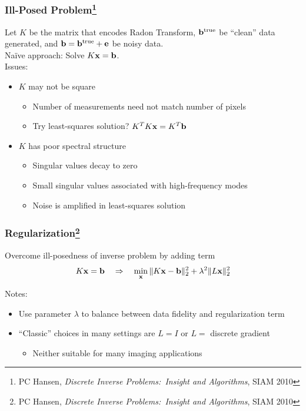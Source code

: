 \documentclass[12pt,t,xcolor=dvipsnames]{beamer}
\renewcommand{\vec}[1]{{\bf #1}}
\renewcommand{\vec}[1]{{\bf #1}}
\begin{document}
\begin{frame}
  \frametitle{Ill-Posed Problem\footnote{PC Hansen, {\it Discrete
        Inverse Problems:\ Insight and Algorithms}, SIAM 2010}}

  Let $K$ be the matrix that encodes Radon Transform, $\vec{b}^{\text{true}}$ be
  ``clean'' data generated, and $\vec{b} =
  \vec{b}^{\text{true}}+\vec{e}$ be noisy data. \\[12pt]

  \alert{Na\"ive approach:} Solve $K\vec{x} = \vec{b}$.\\[12pt]

  \pause
  Issues:
  \begin{itemize}
  \item $K$ may not be square
    \begin{itemize}
    \item Number of measurements need not match number of pixels
      \item Try least-squares solution? $K^TK\vec{x} = K^T\vec{b}$
    \end{itemize}
    \pause

  \item $K$ has poor spectral structure
    \begin{itemize}
    \item Singular values decay to zero
    \item Small singular values associated with high-frequency modes
    \item Noise is amplified in least-squares solution
    \end{itemize}
    
    
  \end{itemize}
  

\end{frame}

\begin{frame}
\frametitle{Regularization\footnote{PC Hansen, {\it Discrete
        Inverse Problems:\ Insight and Algorithms}, SIAM 2010}}
Overcome ill-posedness of inverse problem by adding term
\[
K\vec{x} = \vec{b} \quad \Rightarrow \quad \min_{\vec{x}}
\|K\vec{x}-\vec{b}\|_2^2 + \lambda^2\|L\vec{x}\|_2^2
\]

Notes:
\begin{itemize}
\item Use parameter $\lambda$ to balance between data fidelity and
  regularization term
\item ``Classic'' choices in many settings are $L=I$ or $L = $
  discrete gradient
\begin{itemize}
\item Neither suitable for many imaging applications
\end{itemize}
\end{itemize}

\end{frame}
\end{document}
